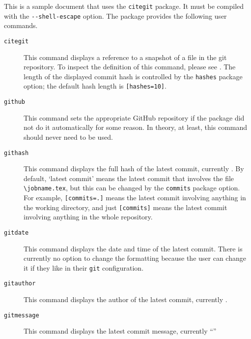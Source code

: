 \documentclass{article}
\begin{document}
	This is a sample document that uses the \verb+citegit+ package.
	It must be compiled with the \verb+--shell-escape+ option.
	The package provides the following user commands.
	\begin{description}
		\item[\texttt{citegit}]
		This command displays a reference to a snapshot of a file in the git
		repository.
		To inspect the definition of this command, please see
		.
		The length of the displayed commit hash is controlled by the \verb+hashes+
		package option; the default hash length is \verb+[hashes=10]+.
		\item[\texttt{github}]
		This command sets the appropriate GitHub repository if the package did
		not do it automatically for some reason.
		In theory, at least, this command should never need to be used.
		\item[\texttt{githash}]
		This command displays the full hash of the latest commit, currently \texttt{\githash}.
		By default, `latest commit' means the latest commit that involves the file
		\verb+\jobname.tex+, but this can be changed by the \verb+commits+
		package option.
		For example, \verb+[commits=.]+ means the latest commit involving
		anything in the working directory, and just \verb+[commits]+ means the
		latest commit involving anything in the whole repository.
		\item[\texttt{gitdate}]
		This command displays the date and time of the latest commit.
		There is currently no option to change the formatting because
		the user can change it if they like in their \verb+git+ configuration.
		\item[\texttt{gitauthor}]
		This command displays the author of the latest commit, currently
		\gitauthor.
		\item[\texttt{gitmessage}]
		This command displays the latest commit message, currently
		``\gitmessage''
	\end{description}
\end{document}
